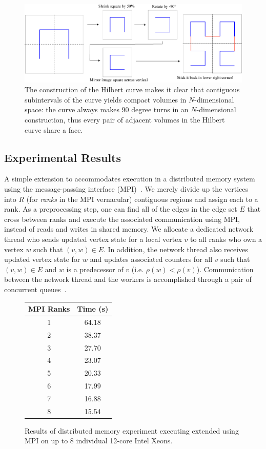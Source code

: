 \begin{figure}[h]
\centering
\includegraphics[width=5in,clip,trim=0 0 0 0]{figures/fourthifs.jpg}
\caption{The construction of the Hilbert curve makes it
clear that contiguous subintervals of the curve yields
compact volumes in $N$-dimensional space: the curve always
makes 90 degree turns in an $N$-dimensional construction,
thus every pair of adjacent volumes in the Hilbert curve share a
face.}
\label{fig:hilbert_construction}
\end{figure}

\subsection{Experimental Results}
\label{sec:mpi_empirical}


A simple extension to  accommodates execution in a distributed
memory system using the message-passing interface (MPI)~\cite{MPI94}.  
We merely divide up the vertices into $R$ (for \emph{ranks}
in the MPI vernacular) contiguous regions and assign each to a rank.  As a 
preprocessing step, one can find all of the edges in the edge set $E$ 
that cross between ranks
and execute the associated communication using MPI, instead of reads and
writes in shared memory.  We allocate a dedicated network thread who sends
updated vertex state for a local vertex $v$ to all ranks who own a vertex
$w$ such that $(v,w) \in E$.  In addition, the network thread also receives
updated vertex state for $w$ and updates associated counters for all
$v$ such that $(v,w) \in E$ and $w$ is a predecessor of 
$v$ (i.e. $\rho(w) < \rho(v)$).  Communication between the network thread
and the workers is accomplished through a pair of concurrent 
queues~\cite{MichaelSc96}.

\begin{figure}
\centering
\begin{tabular}{c|c}
MPI Ranks & Time (s) \\
\hline
  1 & 64.18 \\
  2 & 38.37 \\
  3 & 27.70 \\
  4 & 23.07 \\
  5 & 20.33 \\
  6 & 17.99 \\
  7 & 16.88 \\
  8 & 15.54 \\
\end{tabular}
\caption{Results of distributed memory experiment executing
 extended using MPI on up to 8 individual
12-core Intel Xeons.}
\label{fig:mpi_results}
\end{figure}



